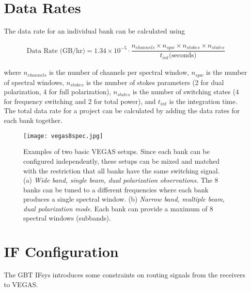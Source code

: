 \section{Data Rates}\label{sec:vegas_data_rates}

The data rate for an individual bank can be calculated using

\begin{align}
\text{Data Rate (GB/hr)} = 1.34\times10^{-5} \cdot\dfrac{
n_{channels}\times n_{spw}\times n_{stokes}\times n_{states}}{t_{int}\text{(seconds)}}
\end{align}

where $n_{channels}$ is the number of channels per spectral window,
$n_{spw}$ is the number of spectral windows, $n_{stokes}$ is the
number of stokes parameters (2 for dual polarization, 4 for full
polarization), $n_{states}$ is the number of switching states (4 for
frequency switching and 2 for total power), and $t_{int}$ is the
integration time. The total data rate for a project can be calculated
by adding the data rates for each bank together.


\begin{figure}[!h]
\begin{center}
\texttt{[image: vegas8spec.jpg]}
\caption[VEGAS setups]{Examples of two basic VEGAS setups. Since each bank
  can be configured independently, these setups can be mixed and
  matched with the restriction that all banks have the same switching signal.
  (a) {\em Wide band, single beam, dual polarization observations.}
  The 8 banks can be tuned to a different frequencies where each bank
  produces a single spectral window.
  (b) {\em Narrow band, multiple beam, dual polarization mode}.  Each bank can provide
  a maximum of 8 spectral windows (subbands).}
\label{fig:vegasconfig} 
\end{center}
\end{figure}

\newpage

\vspace{-1cm}

\section{IF Configuration}\label{sec:vegas_if}
The \gls{GBT} \gls{IFsys} introduces some constraints on routing signals
from the receivers to VEGAS.

